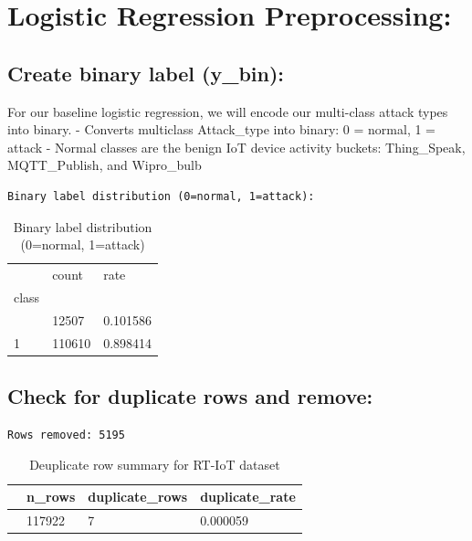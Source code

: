 \documentclass[
  letterpaper,
  DIV=11,
  numbers=noendperiod]{scrartcl}
\begin{document}
\section{Logistic Regression
Preprocessing:}\label{logistic-regression-preprocessing}

\subsection{Create binary label
(y\_bin):}\label{create-binary-label-y_bin}

For our baseline logistic regression, we will encode our multi-class
attack types into binary. - Converts multiclass Attack\_type into
binary: 0 = normal, 1 = attack - Normal classes are the benign IoT
device activity buckets: Thing\_Speak, MQTT\_Publish, and Wipro\_bulb

\begin{verbatim}
Binary label distribution (0=normal, 1=attack):
\end{verbatim}

\begin{longtable}[]{@{}lll@{}}

\caption{\label{tbl-rtiot-lr-binary}Binary label distribution (0=normal,
1=attack)}

\tabularnewline

\toprule\noalign{}
& count & rate \\
class & & \\
\midrule\noalign{}
\endhead
\bottomrule\noalign{}
\endlastfoot
0 & 12507 & 0.101586 \\
1 & 110610 & 0.898414 \\

\end{longtable}

\subsection{Check for duplicate rows and
remove:}\label{check-for-duplicate-rows-and-remove}

\begin{verbatim}
Rows removed: 5195
\end{verbatim}

\begin{longtable}[]{@{}llll@{}}

\caption{\label{tbl-rtiot-lr-deduplication}Deuplicate row summary for
RT-IoT dataset}

\tabularnewline

\toprule\noalign{}
& n\_rows & duplicate\_rows & duplicate\_rate \\
\midrule\noalign{}
\endhead
\bottomrule\noalign{}
\endlastfoot
0 & 117922 & 7 & 0.000059 \\

\end{longtable}
\end{document}
